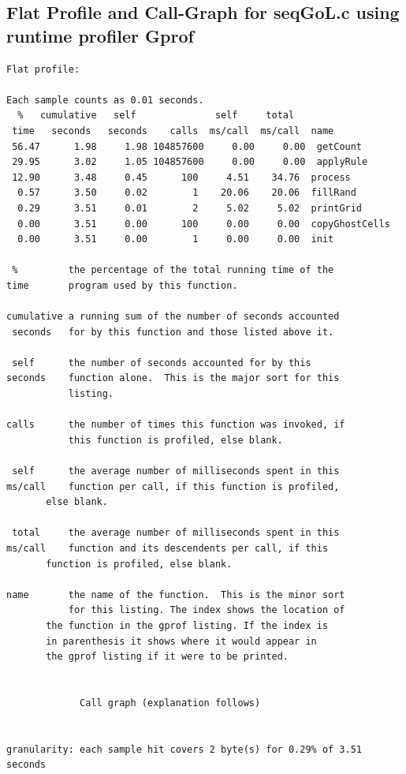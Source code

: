 \documentclass[11pt]{article} %
\begin{document}
\subsection{Flat Profile and Call-Graph for seqGoL.c using runtime profiler Gprof}
\begingroup
\fontsize{10pt}{8pt}
\begin{verbatim}
Flat profile:

Each sample counts as 0.01 seconds.
  %   cumulative   self              self     total           
 time   seconds   seconds    calls  ms/call  ms/call  name    
 56.47      1.98     1.98 104857600     0.00     0.00  getCount
 29.95      3.02     1.05 104857600     0.00     0.00  applyRule
 12.90      3.48     0.45      100     4.51    34.76  process
  0.57      3.50     0.02        1    20.06    20.06  fillRand
  0.29      3.51     0.01        2     5.02     5.02  printGrid
  0.00      3.51     0.00      100     0.00     0.00  copyGhostCells
  0.00      3.51     0.00        1     0.00     0.00  init

 %         the percentage of the total running time of the
time       program used by this function.

cumulative a running sum of the number of seconds accounted
 seconds   for by this function and those listed above it.

 self      the number of seconds accounted for by this
seconds    function alone.  This is the major sort for this
           listing.

calls      the number of times this function was invoked, if
           this function is profiled, else blank.
 
 self      the average number of milliseconds spent in this
ms/call    function per call, if this function is profiled,
	   else blank.

 total     the average number of milliseconds spent in this
ms/call    function and its descendents per call, if this 
	   function is profiled, else blank.

name       the name of the function.  This is the minor sort
           for this listing. The index shows the location of
	   the function in the gprof listing. If the index is
	   in parenthesis it shows where it would appear in
	   the gprof listing if it were to be printed.


		     Call graph (explanation follows)


granularity: each sample hit covers 2 byte(s) for 0.29% of 3.51 seconds


\end{verbatim}
\end{document}
